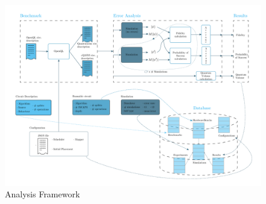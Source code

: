 \begin{figure}

\begin{center}
\includegraphics[width=.9\linewidth]{figures/error_framework_diagram.png}
\end{center}


    \caption{Analysis Framework}
    \label{fig:general_error_framework}
\end{figure}

